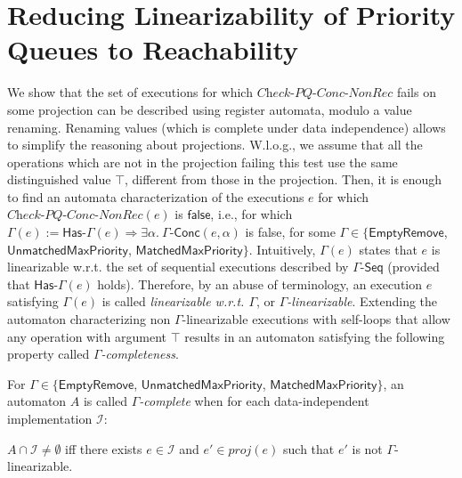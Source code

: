 \section{Reducing Linearizability of Priority Queues to Reachability}
\label{sec:co-regular of extended priority queues}

We show that the set of executions for which $\textit{Check-PQ-Conc-NonRec}$ fails on some projection can be described using register automata, modulo a value renaming. Renaming values (which is complete under data independence) allows to simplify the reasoning about projections. W.l.o.g., we assume that all the operations which are not in the projection failing this test use the same distinguished value $\top$, different from those in the projection. Then, it is enough to find an automata characterization of the executions $e$ for which $\textit{Check-PQ-Conc-NonRec}(e)$ is $\mathsf{false}$, i.e., for which
$\Gamma(e) := \mathsf{Has\text{-}}\Gamma(e) \Rightarrow \exists \alpha.\ \Gamma\mathsf{\text{-}Conc}(e,\alpha)$ is false, for some $\Gamma\in \{\mathsf{EmptyRemove}$, $\mathsf{UnmatchedMaxPriority}$, $\mathsf{MatchedMaxPriority}\}$.
Intuitively, $\Gamma(e)$ states that $e$ is linearizable w.r.t. the set of sequential executions described by $\Gamma\mathsf{\text{-}Seq}$ (provided that $\mathsf{Has\text{-}}\Gamma(e)$ holds). Therefore, by an abuse of terminology, an execution $e$ satisfying $\Gamma(e)$ is called \emph{linearizable w.r.t. $\Gamma$}, or \emph{$\Gamma$-linearizable}.
Extending the automaton characterizing non $\Gamma$-linearizable executions with self-loops that allow any operation with argument $\top$ results in an automaton satisfying the following property called \emph{$\Gamma$-completeness}.

\begin{definition}
For $\Gamma\in \{\mathsf{EmptyRemove}$, $\mathsf{UnmatchedMaxPriority}$, $\mathsf{MatchedMaxPriority}\}$, an automaton $A$ is called \emph{$\Gamma$-complete} when for each data-independent implementation $\mathcal{I}$:

$A \cap \mathcal{I} \neq \emptyset$ iff there exists $e \in \mathcal{I}$ and $e' \in \textit{proj}(e)$ such that $e'$ is not $\Gamma$-linearizable.
\end{definition}




